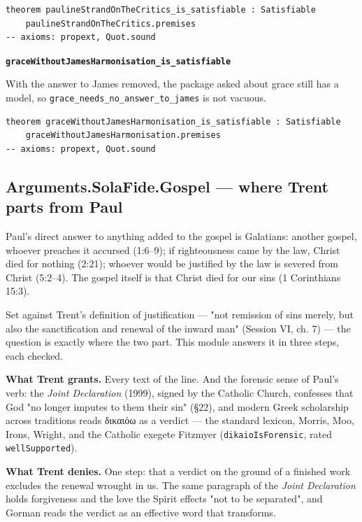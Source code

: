 \documentclass[11pt]{article}
\begin{document}
{\small\begin{verbatim}
theorem paulineStrandOnTheCritics_is_satisfiable : Satisfiable
    paulineStrandOnTheCritics.premises
-- axioms: propext, Quot.sound
\end{verbatim}}
\par\medskip\noindent\textbf{\texttt{grace\allowbreak{}Without\allowbreak{}James\allowbreak{}Harmonisation\_\allowbreak{}is\_\allowbreak{}satisfiable}}\par\nobreak\noindent
With the answer to James removed, the package asked about grace still has a model, so \texttt{grace\_\allowbreak{}needs\_\allowbreak{}no\_\allowbreak{}answer\_\allowbreak{}to\_\allowbreak{}james} is not vacuous.

{\small\begin{verbatim}
theorem graceWithoutJamesHarmonisation_is_satisfiable : Satisfiable
    graceWithoutJamesHarmonisation.premises
-- axioms: propext, Quot.sound
\end{verbatim}}
\subsection*{Arguments.SolaFide.Gospel — where Trent parts from Paul}
Paul's direct answer to anything added to the gospel is Galatians: another gospel, whoever preaches it accursed (1:6–9); if righteousness came by the law, Christ died for nothing (2:21); whoever would be justified by the law is severed from Christ (5:2–4). The gospel itself is that Christ died for our sins (1 Corinthians 15:3).

Set against Trent's definition of justification — "not remission of sins merely, but also the sanctification and renewal of the inward man" (Session VI, ch. 7) — the question is exactly where the two part. This module answers it in three steps, each checked.

\textbf{What Trent grants.} Every text of the line. And the forensic sense of Paul's verb: the \emph{Joint Declaration} (1999), signed by the Catholic Church, confesses that God "no longer imputes to them their sin" (§22), and modern Greek scholarship across traditions reads δικαιόω as a verdict — the standard lexicon, Morris, Moo, Irons, Wright, and the Catholic exegete Fitzmyer (\texttt{dikaio\allowbreak{}Is\allowbreak{}Forensic}, rated \texttt{well\allowbreak{}Supported}).

\textbf{What Trent denies.} One step: that a verdict on the ground of a finished work excludes the renewal wrought in us. The same paragraph of the \emph{Joint Declaration} holds forgiveness and the love the Spirit effects "not to be separated", and Gorman reads the verdict as an effective word that transforms.
\end{document}
